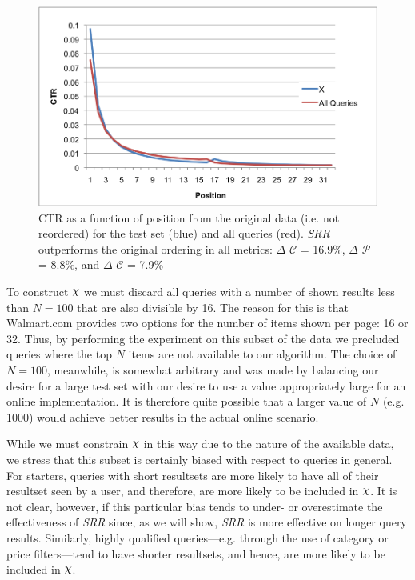 \documentclass{article}
\def\Chi{\raisebox{2pt}{$\chi$}}
\begin{document}
\begin{figure}[htbp!]
    \centering
    \includegraphics[width=\textwidth]{CTRcompare.png}
    \protect\caption{CTR as a function of position from the original data (i.e.
    not reordered) for the test set \protect\raisebox{2pt}{$\chi$} (blue) and
    all queries (red). {\em SRR} outperforms the original ordering in all
    metrics: $\Delta$ $\mathscr{C}$ = 16.9\%, $\Delta$ $\mathscr{P}$ = 8.8\%, and $\Delta$
$\mathscr{C}$ = 7.9\%}
    \label{fig:ctr_vs_position}
\end{figure}

To construct $\Chi$ we  must discard all queries with a number of shown results
less than $N=100$ that are also divisible by 16. The reason for this is that
Walmart.com provides two options for the number of items shown per page: 16 or
32. Thus, by performing the experiment on this subset of the data we precluded
queries where the top $N$ items are not available to our algorithm.  The choice
of $N=100$, meanwhile, is somewhat arbitrary and was made by balancing our
desire for a large test set with our desire to use a value appropriately large
for an online implementation. It is therefore quite possible that a larger value
of $N$ (e.g. 1000) would achieve better results in the actual online scenario.

While we must constrain $\Chi$ in this way due to the nature of the available
data, we stress that this subset is certainly biased with respect to queries in
general. For starters, queries with short resultsets are more likely to have all
of their resultset seen by a user, and therefore, are more likely to be included
in $\Chi$. It is not clear, however, if this particular bias tends to under- or
overestimate the effectiveness of {\em SRR} since, as we will show, {\em SRR} is
more effective on longer query results. Similarly, highly qualified
queries---e.g. through the use of category or price filters---tend to have
shorter resultsets, and hence, are more likely to be included in $\Chi$.
\end{document}
